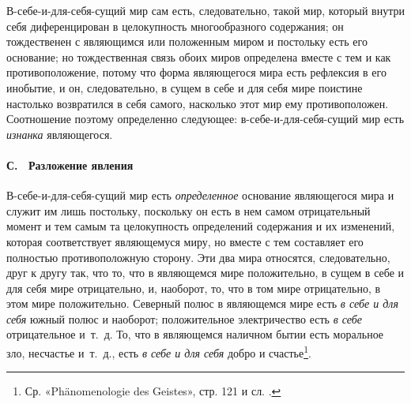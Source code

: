 В-себе-и-для-себя-сущий мир сам есть, следовательно, такой мир, который
внутри себя диференцирован в целокупность многообразного содержания; он
тождественен с являющимся или положенным миром и постольку есть его
основание; но тождественная связь обоих миров определена вместе с тем и как
противоположение, потому что форма являющегося мира есть рефлексия в его
инобытие, и он, следовательно, в сущем в себе и для себя мире поистине
настолько возвратился в себя самого, насколько этот мир ему противоположен.
Соотношение поэтому определенно следующее: в-себе-и-для-себя-сущий мир есть
{\em изнанка} являющегося.

\paragraph[С. \ Разложение явления]{С. \ Разложение явления}
В-себе-и-для-себя-сущий мир есть
{\em определенное} основание являющегося мира и служит
им лишь постольку, поскольку он есть в нем самом отрицательный момент и тем
самым та целокупность определений содержания и их изменений, которая
соответствует являющемуся миру, но вместе с тем составляет его полностью
противоположную сторону. Эти два мира относятся, следовательно, друг к
другу так, что то, что в являющемся мире положительно, в сущем в себе и для
себя мире отрицательно, и, наоборот, то, что в том мире отрицательно, в
этом мире положительно. Северный полюс в являющемся мире есть
{\em в себе и для себя} южный полюс и наоборот;
положительное электричество есть {\em в себе}
отрицательное и~т.~д. То, что в являющемся наличном бытии есть моральное
зло, несчастье и~т.~д., есть {\em в себе и для себя}
добро и счастье\footnote{ Ср. «Phänomenologie des Geistes», стр. 121 и сл.
\label{bkm:Ref474667017}.}.

